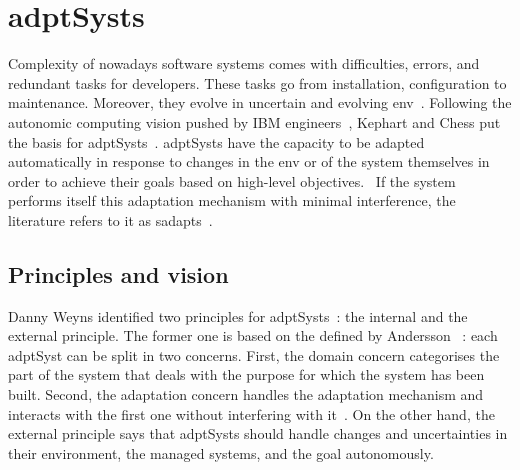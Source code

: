 \section[Adaptive systems]{\Glspl{adptSyst}}
\label{sec:back:adapt-syst}

Complexity of nowadays software systems comes with difficulties, errors, and redundant tasks for developers.
These tasks go from installation, configuration to maintenance.
Moreover, they evolve in uncertain and evolving \gls{env}~\cite{DBLP:conf/dagstuhl/EsfahaniM10}.
Following the autonomic computing vision pushed by IBM engineers~\cite{computing2006architectural}, Kephart and Chess put the basis for \glspl{adptSyst}~\cite{DBLP:journals/computer/KephartC03}.
\Glspl{adptSyst} have the capacity to be adapted automatically in response to changes in the \gls{env} or of the system themselves in order to achieve their goals based on high-level objectives.~\cite{DBLP:conf/dagstuhl/ChengLGIMABBBCSDFGGGKKKLMMMPSTTWW09}
If the system performs itself this adaptation mechanism with minimal interference, the literature refers to it as \glspl{sadapt}~\cite{DBLP:conf/dagstuhl/BrunSGGKLMPS09}.

\subsection{Principles and vision}

Danny Weyns	identified two principles for \glspl{adptSyst}~\cite{DBLP:books/sp/19/Weyns19}: the internal and the external principle.
The former one is based on the  defined by Andersson \etal ~\cite{DBLP:conf/icse/AnderssonLMW09}: each \gls{adptSyst} can be split in two concerns.
First, the domain concern categorises the part of the system that deals with the purpose for which the system has been built.
Second, the adaptation concern handles the adaptation mechanism and interacts with the first one without interfering with it~\cite{DBLP:journals/tse/KramerM90}.
On the other hand, the external principle says that \glspl{adptSyst} should handle changes and uncertainties in their environment, the managed systems, and the goal autonomously.

